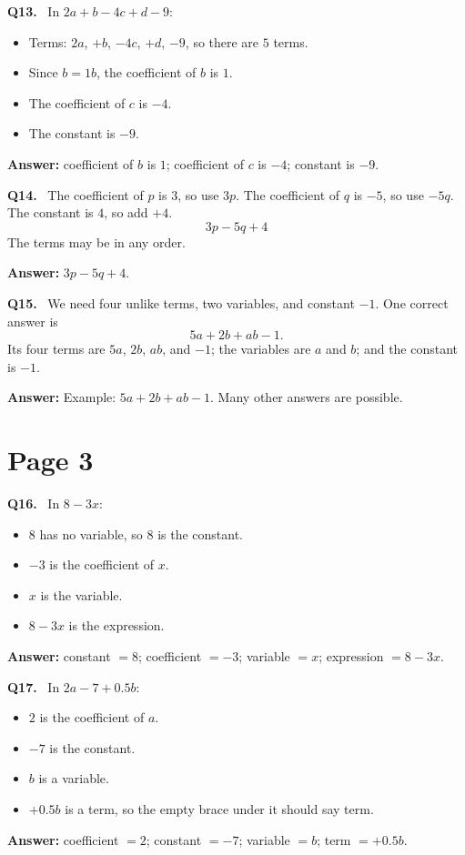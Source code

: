 \documentclass[12pt,a4paper]{article}
\newcommand{\solQ}[1]{\textbf{#1.}\ }
\newcommand{\ans}[1]{\par\noindent\textbf{Answer: }#1\par}
\begin{document}
\begin{solbox}
\solQ{Q13} In \(2a+b-4c+d-9\):
\begin{itemize}
  \item Terms: \(2a\), \(+b\), \(-4c\), \(+d\), \(-9\), so there are \(5\) terms.
  \item Since \(b=1b\), the coefficient of \(b\) is \(1\).
  \item The coefficient of \(c\) is \(-4\).
  \item The constant is \(-9\).
\end{itemize}
\ans{coefficient of \(b\) is \(1\); coefficient of \(c\) is \(-4\); constant is \(-9\).}
\end{solbox}

\begin{solbox}
\solQ{Q14} The coefficient of \(p\) is \(3\), so use \(3p\). The coefficient of \(q\) is \(-5\), so use \(-5q\). The constant is \(4\), so add \(+4\).
\[
3p-5q+4
\]
The terms may be in any order.
\ans{\(3p-5q+4\).}
\end{solbox}

\begin{solbox}
\solQ{Q15} We need four unlike terms, two variables, and constant \(-1\). One correct answer is
\[
5a+2b+ab-1.
\]
Its four terms are \(5a\), \(2b\), \(ab\), and \(-1\); the variables are \(a\) and \(b\); and the constant is \(-1\).
\ans{Example: \(5a+2b+ab-1\). Many other answers are possible.}
\end{solbox}

\section*{Page 3}

\begin{solbox}
\solQ{Q16} In \(8-3x\):
\begin{itemize}
  \item \(8\) has no variable, so \(8\) is the constant.
  \item \(-3\) is the coefficient of \(x\).
  \item \(x\) is the variable.
  \item \(8-3x\) is the expression.
\end{itemize}
\ans{constant \(=8\); coefficient \(=-3\); variable \(=x\); expression \(=8-3x\).}
\end{solbox}

\begin{solbox}
\solQ{Q17} In \(2a-7+0.5b\):
\begin{itemize}
  \item \(2\) is the coefficient of \(a\).
  \item \(-7\) is the constant.
  \item \(b\) is a variable.
  \item \(+0.5b\) is a term, so the empty brace under it should say term.
\end{itemize}
\ans{coefficient \(=2\); constant \(=-7\); variable \(=b\); term \(=+0.5b\).}
\end{solbox}
\end{document}
